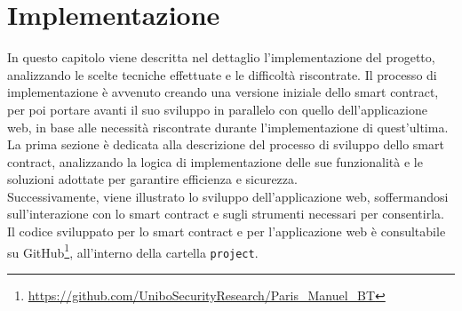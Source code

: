 \documentclass[12pt,a4paper,openright,twoside]{report}
\begin{document}
\chapter{Implementazione}
\label{chap:implementation}
In questo capitolo viene descritta nel dettaglio l'implementazione del progetto, analizzando le scelte tecniche effettuate e le difficoltà riscontrate. Il processo di implementazione è avvenuto creando una versione iniziale dello smart contract, per poi portare avanti il suo sviluppo in parallelo con quello dell'applicazione web, in base alle necessità riscontrate durante l'implementazione di quest'ultima.\\
La prima sezione è dedicata alla descrizione del processo di sviluppo dello smart contract, analizzando la logica di implementazione delle sue funzionalità e le soluzioni adottate per garantire efficienza e sicurezza.\\
Successivamente, viene illustrato lo sviluppo dell'applicazione web, soffermandosi sull'interazione con lo smart contract e sugli strumenti necessari per consentirla.\\
Il codice sviluppato per lo smart contract e per l'applicazione web è consultabile su GitHub\footnote{\url{https://github.com/UniboSecurityResearch/Paris_Manuel_BT}}, all'interno della cartella \texttt{project}.
\end{document}
